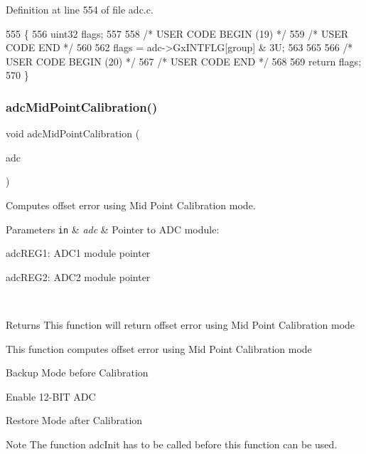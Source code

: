 Definition at line 554 of file adc.\+c.


\begin{DoxyCode}
555 \{
556     uint32 flags;
557 
558 \textcolor{comment}{/* USER CODE BEGIN (19) */}
559 \textcolor{comment}{/* USER CODE END */}
560 
562     flags = adc->GxINTFLG[group] & 3U;
563 
565 
566 \textcolor{comment}{/* USER CODE BEGIN (20) */}
567 \textcolor{comment}{/* USER CODE END */}
568 
569     \textcolor{keywordflow}{return} flags;
570 \}
\end{DoxyCode}
\mbox{\label{group__ADC_ga6197438221bd189905b1a86a35272842}} 
\subsubsection{\texorpdfstring{adc\+Mid\+Point\+Calibration()}{adcMidPointCalibration()}}
{\footnotesize\ttfamily void adc\+Mid\+Point\+Calibration (\begin{DoxyParamCaption}\item[{\mbox{\hyperlink{reg__adc_8h_ab98b3b090eb1fd96596cd337a5fc0a4e}{adc\+B\+A\+S\+E\+\_\+t}} $\ast$}]{adc }\end{DoxyParamCaption})}



Computes offset error using Mid Point Calibration mode. 


\begin{DoxyParams}[1]{Parameters}
\mbox{\tt in}  & {\em adc} & Pointer to A\+DC module\+:
\begin{DoxyItemize}
\item adc\+R\+E\+G1\+: A\+D\+C1 module pointer
\item adc\+R\+E\+G2\+: A\+D\+C2 module pointer 
\end{DoxyItemize}\\
\hline
\end{DoxyParams}
\begin{DoxyReturn}{Returns}
This function will return offset error using Mid Point Calibration mode
\end{DoxyReturn}
This function computes offset error using Mid Point Calibration mode 
\begin{DoxyItemize}
\item Backup Mode before Calibration ~\newline
~\newline
~\newline

\item Enable 12-\/\+B\+IT A\+DC ~\newline
~\newline

\item Restore Mode after Calibration ~\newline
 \begin{DoxyNote}{Note}
The function adc\+Init has to be called before this function can be used. 
\end{DoxyNote}

\end{DoxyItemize}

